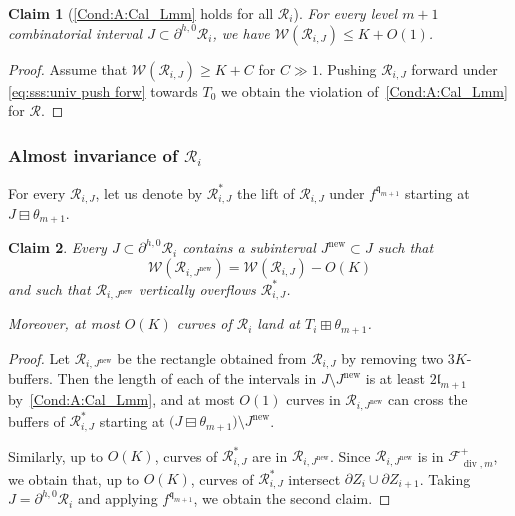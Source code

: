 \documentclass{amsart}
\newcommand{\1}{{\mathbb 1 }}
\renewcommand{\div}{{\operatorname{div}}}
\newcommand{\Fam}{{\mathcal F}}
\newcommand{\Width}{{\mathcal W}}
\newcommand\RR{\mathcal{R}}
\newcommand{\qq}{\mathfrak{q}}
\newcommand{\length}{{\mathfrak l}}
\newcommand\new{{\operatorname{new}}}
\newtheorem{claim4}{Claim}
\theoremstyle{remark}
\numberwithin{equation}{section}
\theoremstyle{definition}
\begin{document}
\begin{claim4}[\ref{Cond:A:Cal_Lmm} holds for all $\RR_i$]
\label{cl4:A for RR_i}
For every level $m+1$ combinatorial interval $J\subset \partial^{h,0} \RR_i $, we have $\Width(\RR_{i, J})\le K+O(1)$.  
\end{claim4}
\begin{proof}
Assume that $\Width(\RR_{i, J})\ge K +C$ for $C\gg 1$. Pushing $\RR_{i, J}$ forward under \eqref{eq:sss:univ push forw} towards $T_0$ we obtain the violation of~\ref{Cond:A:Cal_Lmm} for $\RR$.
\end{proof}


\subsubsection{Almost invariance of $\RR_i$} For every $\RR_{i,J}$, let us denote by $\RR^*_{i,J}$ the lift of $\RR_{i,J}$ under $f^{\qq_{m
+1}}$ starting at $J \boxminus \theta_{m+1}$.


\begin{claim4}
\label{cl4:RR is invar} Every $J\subset \partial^{h,0} \RR_i$ contains a subinterval $J^\new\subset J$ such that
\[\Width(\RR_{i,J^\new}) = \Width(\RR_{i,J})-O(K)\]
and such that $\RR_{i,J^\new}$ vertically overflows $\RR^*_{i,J}$.

Moreover, at most $O(K)$ curves of $\RR_{i}$ land at $T_i\boxplus \theta_{m+1}$.
\end{claim4}
\begin{proof}
Let $\RR_{i,J^\new}$ be the rectangle obtained from $\RR_{i,J}$ by removing two $3K$-buffers. Then the length of each of the intervals in $J\setminus J^\new$ is at least $2\length_{m+1}$ by~\ref{Cond:A:Cal_Lmm}, and at most $O(1)$ curves in $\RR_{i,J^\new}$ can cross the buffers of $\RR^*_{i,J}$ starting at $\big(J\boxminus \theta_{m+1}\big)\setminus J^\new$.

Similarly, up to $O(K)$, curves of $\RR^*_{i,J}$ are in $\RR_{i,J^\new}$. Since $\RR_{i,J^\new}$ is in $\Fam^+_{\div, m}$, we obtain that, up to  $O(K)$, curves of $\RR^*_{i,J}$ intersect $\partial Z_i\cup \partial Z_{i+1}$. Taking $J=\partial^{h,0}\RR_i$ and applying $f^{\qq_{m+1}}$, we obtain the second claim.
\end{proof}
\end{document}
